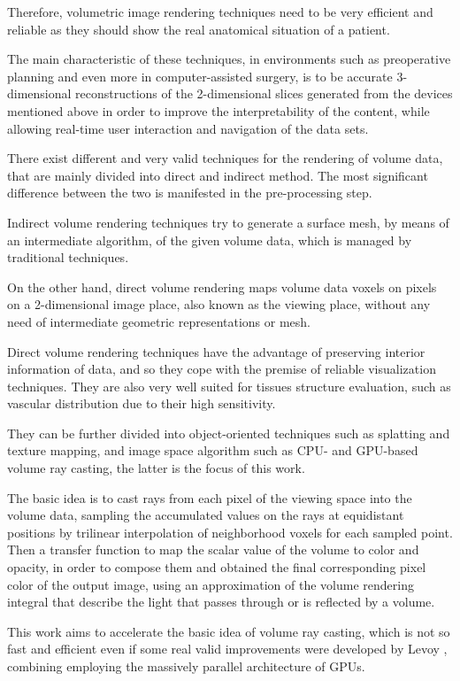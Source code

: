 \documentclass[12pt,a4paper]{extarticle}
\newcommand{\linespace}{\vspace{0pt}}
\begin{document}
Therefore, volumetric image rendering techniques need to be very efficient and reliable as they should show the real anatomical situation of a patient.

The main characteristic of these techniques, in environments such as preoperative planning and even more in computer-assisted surgery, is to be accurate 3-dimensional reconstructions of the 2-dimensional slices generated from the devices mentioned above in order to improve the interpretability of the content, while allowing real-time user interaction and navigation of the data sets.
\linespace

There exist different and very valid techniques for the rendering of volume data, that are mainly divided into direct and indirect method. The most significant difference between the two is manifested in the pre-processing step.

Indirect volume rendering techniques try to generate a surface mesh, by means of an intermediate algorithm, of the given volume data, which is managed by traditional techniques.

On the other hand, direct volume rendering maps volume data voxels on pixels on a 2-dimensional image place, also known as the viewing place, without any need of intermediate geometric representations or mesh.

Direct volume rendering techniques have the advantage of preserving interior information of data, and so they cope with the premise of reliable visualization techniques. They are also very well suited for tissues structure evaluation, such as vascular distribution due to their high sensitivity.

They can be further divided into object-oriented techniques such as splatting and texture mapping, and image space algorithm such as CPU- and GPU-based volume ray casting, the latter is the focus of this work.

The basic idea is to cast rays from each pixel of the
viewing space into the volume data, sampling the accumulated values on the rays at equidistant positions by trilinear interpolation of neighborhood voxels for each sampled point. Then a transfer function to map the scalar value of
the volume to color and opacity, in order to compose them and obtained the final corresponding pixel color of the output image, using an approximation of the volume rendering integral that describe the light that passes through or is reflected by a volume.
\linespace

This work aims to accelerate the basic idea of volume ray casting, which is not so fast and efficient even if some real valid improvements were developed by Levoy \cite{levoy_1990:5}, combining employing the massively parallel architecture of GPUs.
\end{document}
